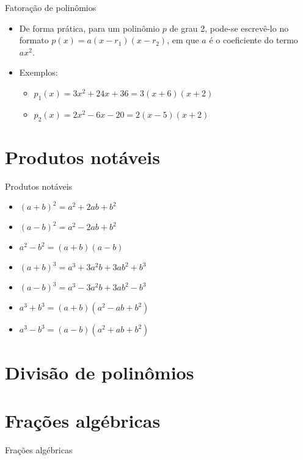 \documentclass[14pt, aspectratio=169]{beamer}
\newcommand{\skipframe}{\vspace{10.0cm}}
\begin{document}
\begin{frame}[allowframebreaks]{Fatoração de polinômios}
\begin{itemize}
    \skipframe

    \item De forma prática, para um polinômio $p$ de grau 2, pode-se escrevê-lo no formato $p(x) = a(x - r_1)(x - r_2)$, em que $a$ é o coeficiente do termo $ax^2$.

    \item Exemplos:
    \begin{itemize}
        \item $p_1(x) = 3x^2 + 24x + 36 = 3(x + 6)(x + 2)$
        \item $p_2(x) = 2x^2 - 6x - 20 = 2(x - 5)(x + 2)$
    \end{itemize}

\end{itemize}
    
\end{frame}

\section{Produtos notáveis}

\begin{frame}{Produtos notáveis}

\begin{itemize}
    \item $(a + b)^2 = a^2 + 2ab + b^2$
    \item $(a - b)^2 = a^2 - 2ab + b^2$
    \item $a^2 - b^2 = (a + b)(a - b)$
    \item $(a + b)^3 = a^3 + 3a^2b + 3ab^2 + b^3$
    \item $(a - b)^3 = a^3 - 3a^2b + 3ab^2 - b^3$
    \item $a^3 + b^3 = (a + b)(a^2 - ab + b^2)$
    \item $a^3 - b^3 = (a - b)(a^2 + ab + b^2)$
\end{itemize}
    
\end{frame}

\section{Divisão de polinômios}

\section{Frações algébricas}

\begin{frame}[allowframebreaks]{Frações algébricas}
    
\end{frame}
\end{document}
